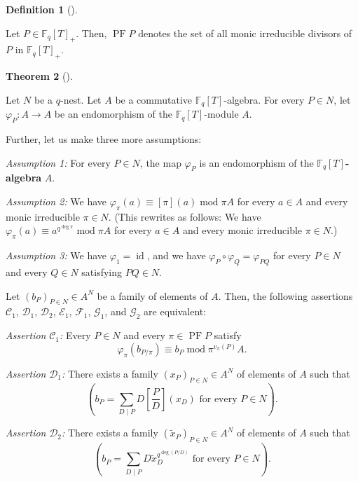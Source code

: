 \documentclass[numbers=enddot,12pt,final,onecolumn,notitlepage]{scrartcl}%
\theoremstyle{definition}
\newtheorem{theo}{Theorem}[section]
\newenvironment{theorem}[1][]
{\begin{theo}[#1]\begin{leftbar}}
{\end{leftbar}\end{theo}}
\newtheorem{defi}[theo]{Definition}
\newenvironment{definition}[1][]
{\begin{defi}[#1]\begin{leftbar}}
{\end{leftbar}\end{defi}}
\let\sumnonlimits\sum
\renewcommand{\sum}{\sumnonlimits\limits}
\begin{document}
\begin{definition}
\label{def.PF(q)}Let $P\in\mathbb{F}_{q}\left[  T\right]  _{+}$. Then,
$\operatorname{PF}P$ denotes the set of all monic irreducible divisors of $P$
in $\mathbb{F}_{q}\left[  T\right]  _{+}$.
\end{definition}

\begin{theorem}
\label{thm.carlitz.gW}Let $N$ be a $q$-nest. Let $A$ be a commutative
$\mathbb{F}_{q}\left[  T\right]  $-algebra. For every $P\in N$, let
$\varphi_{P}:A\rightarrow A$ be an endomorphism of the $\mathbb{F}_{q}\left[
T\right]  $-module $A$.

Further, let us make three more assumptions:

\textit{Assumption 1:} For every $P\in N$, the map $\varphi_{P}$ is an
endomorphism of the $\mathbb{F}_{q}\left[  T\right]  $\textbf{-algebra} $A$.

\textit{Assumption 2:} We have $\varphi_{\pi}\left(  a\right)  \equiv\left[
\pi\right]  \left(  a\right)  \operatorname{mod}\pi A$ for every $a\in A$ and
every monic irreducible $\pi\in N$. (This rewrites as follows: We have
$\varphi_{\pi}\left(  a\right)  \equiv a^{q^{\deg\pi}}\operatorname{mod}\pi A$
for every $a\in A$ and every monic irreducible $\pi\in N$.)

\textit{Assumption 3:} We have $\varphi_{1}=\operatorname*{id}$, and we have
$\varphi_{P}\circ\varphi_{Q}=\varphi_{PQ}$ for every $P\in N$ and every $Q\in
N$ satisfying $PQ\in N$.

Let $\left(  b_{P}\right)  _{P\in N}\in A^{N}$ be a family of elements of $A$.
Then, the following assertions $\mathcal{C}_{1}$, $\mathcal{D}_{1}$,
$\mathcal{D}_{2}$, $\mathcal{E}_{1}$, $\mathcal{F}_{1}$, $\mathcal{G}_{1}$,
and $\mathcal{G}_{2}$ are equivalent:

\textit{Assertion }$\mathcal{C}_{1}$\textit{:} Every $P\in N$ and every
$\pi\in\operatorname{PF}P$ satisfy%
\[
\varphi_{\pi}\left(  b_{P/\pi}\right)  \equiv b_{P}\operatorname{mod}%
\pi^{v_{\pi}\left(  P\right)  }A.
\]


\textit{Assertion }$\mathcal{D}_{1}$\textit{:} There exists a family $\left(
x_{P}\right)  _{P\in N}\in A^{N}$ of elements of $A$ such that%
\[
\left(  b_{P}=\sum_{D\mid P}D\left[  \dfrac{P}{D}\right]  \left(
x_{D}\right)  \text{ for every }P\in N\right)  .
\]


\textit{Assertion }$\mathcal{D}_{2}$\textit{:} There exists a family $\left(
\widetilde{x}_{P}\right)  _{P\in N}\in A^{N}$ of elements of $A$ such that%
\[
\left(  b_{P}=\sum_{D\mid P}D\widetilde{x}_{D}^{q^{\deg\left(  P/D\right)  }%
}\text{ for every }P\in N\right)  .
\]



\end{theorem}
\end{document}
